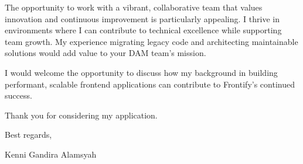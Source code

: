 \documentclass[a4paper, 11pt]{article}
\begin{document}
The opportunity to work with a vibrant, collaborative team that values innovation and continuous improvement is particularly appealing. I thrive in environments where I can contribute to technical excellence while supporting team growth. My experience migrating legacy code and architecting maintainable solutions would add value to your DAM team's mission.

I would welcome the opportunity to discuss how my background in building performant, scalable frontend applications can contribute to Frontify's continued success.

Thank you for considering my application.

\vspace{10pt}

Best regards,

Kenni Gandira Alamsyah
\end{document}
